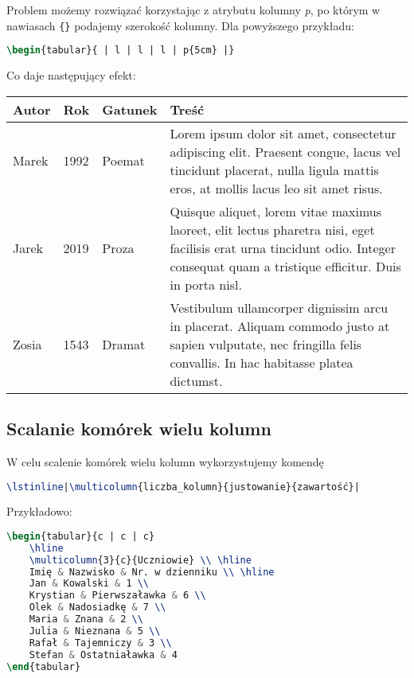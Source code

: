 \documentclass[10pt,a4paper]{article}
\begin{document}
Problem możemy rozwiązać korzystając z atrybutu kolumny \emph{p}, po którym w nawiasach \lstinline|{}| podajemy szerokość kolumny. Dla powyższego przykładu:

\begin{lstlisting}[language=TeX]
	\begin{tabular}{ | l | l | l | p{5cm} |}
\end{lstlisting}

Co daje następujący efekt:

\begin{tabular}{ | l | l | l | p{5cm} |}
	\hline
	Autor & Rok & Gatunek & Treść \\ \hline
	Marek & 1992 & Poemat & Lorem ipsum dolor sit amet, consectetur adipiscing elit. Praesent congue, lacus vel tincidunt placerat, nulla ligula mattis eros, at mollis lacus leo sit amet risus. \\ \hline
	Jarek & 2019 & Proza & Quisque aliquet, lorem vitae maximus laoreet, elit lectus pharetra nisi, eget facilisis erat urna tincidunt odio. Integer consequat quam a tristique efficitur. Duis in porta nisl. \\ \hline
	Zosia & 1543 & Dramat & Vestibulum ullamcorper dignissim arcu in placerat. Aliquam commodo justo at sapien vulputate, nec fringilla felis convallis. In hac habitasse platea dictumst. \\
	\hline
\end{tabular}

\subsection{Scalanie komórek wielu kolumn}

W celu scalenie komórek wielu kolumn wykorzystujemy komendę

\begin{lstlisting}[language=TeX]
\lstinline|\multicolumn{liczba_kolumn}{justowanie}{zawartość}|
\end{lstlisting}

Przykładowo:

\begin{lstlisting}[language=TeX]
\begin{tabular}{c | c | c}
	\hline
	\multicolumn{3}{c}{Uczniowie} \\ \hline
	Imię & Nazwisko & Nr. w dzienniku \\ \hline
	Jan & Kowalski & 1 \\
	Krystian & Pierwszaławka & 6 \\
	Olek & Nadosiadkę & 7 \\
	Maria & Znana & 2 \\
	Julia & Nieznana & 5 \\
	Rafał & Tajemniczy & 3 \\
	Stefan & Ostatniaławka & 4
\end{tabular}
\end{lstlisting}
\end{document}
